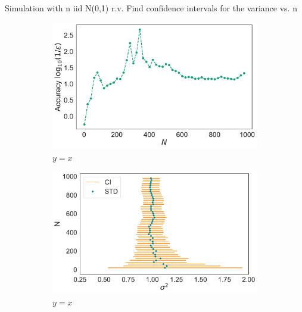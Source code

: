 \documentclass[twoside,onecolumn]{article}
\theoremstyle{definition}
\begin{document}
Simulation with n iid N(0,1) r.v.
Find confidence intervals for the variance vs. n
\begin{figure} \centering
\begin{subfigure}{0.45\textwidth}
         \includegraphics[width=\textwidth]{../figs/norm_mean_accuracy.pdf}
         \caption{$y=x$}\label{fig:y equals x}
     \end{subfigure}
     \begin{subfigure}{0.5\textwidth}
         \includegraphics[width=\textwidth]{../figs/norm_variance_CI.pdf}
         \caption{$y=x$}
         \label{fig:y equals x}
     \end{subfigure}
  \caption{}\label{fig:N_unif}
\end{figure}
\end{document}
